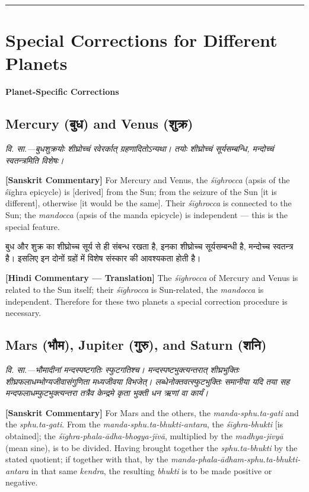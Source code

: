 \documentclass[11pt,a4paper]{book}
\newcommand{\dev}[1]{{\devanagarifont #1}}
\newcommand{\sktcommbilingual}[2]{%
  \par\vspace{0.5em}%
  \noindent\begin{minipage}[t]{0.48\textwidth}
    \RaggedRight\small\itshape
    \dev{#1}
  \end{minipage}%
  \hfill
  \begin{minipage}[t]{0.48\textwidth}
    \RaggedRight\small
    #2%
  \end{minipage}%
  \par\vspace{0.5em}%
}
\newcommand{\hindicommbilingual}[2]{%
  \par\vspace{0.5em}%
  \noindent\begin{minipage}[t]{0.48\textwidth}
    \RaggedRight\small
    \dev{#1}
  \end{minipage}%
  \hfill
  \begin{minipage}[t]{0.48\textwidth}
    \RaggedRight\small
    #2%
  \end{minipage}%
  \par\vspace{0.5em}%
}
\newcommand{\ruleheadingbilingual}[2]{%
  \par\vspace{0.8em}%
  \noindent\begin{minipage}[t]{0.48\textwidth}
    \textbf{\color{sectioncolor}\dev{#1}}
  \end{minipage}%
  \hfill
  \begin{minipage}[t]{0.48\textwidth}
    \textbf{\color{sectioncolor}#2}
  \end{minipage}%
  \par\vspace{0.4em}%
}
\newcommand{\secdivider}{%
  \begin{center}\rule{0.4\textwidth}{0.5pt}\end{center}%
}
\begin{document}
\secdivider
\clearpage

\section{Special Corrections for Different Planets}

\ruleheadingbilingual{विशेषसंस्काराः}{Planet-Specific Corrections}

\subsection*{Mercury (\dev{बुध}) and Venus (\dev{शुक्र})}

\sktcommbilingual{%
\dev{वि. सा.}---बुधशुक्रयोः शीघ्रोच्चं रवेरर्कात्‌ ग्रहणादितोऽन्यथा। तयोः शीघ्रोच्चं सूर्यसम्बन्धि, मन्दोच्चं स्वतन्त्रमिति विशेषः।
}{%
\textbf{[Sanskrit Commentary]} For Mercury and Venus, the \textit{śīghrocca} (apsis of the śīghra epicycle) is [derived] from the Sun; from the seizure of the Sun [it is different], otherwise [it would be the same]. Their \textit{śīghrocca} is connected to the Sun; the \textit{mandocca} (apsis of the manda epicycle) is independent --- this is the special feature.
}

\hindicommbilingual{%
बुध और शुक्र का शीघ्रोच्च सूर्य से ही संबन्ध रखता है, इनका शीघ्रोच्च सूर्यसम्बन्धी है, मन्दोच्च स्वतन्त्र है। इसलिए इन दोनों ग्रहों में विशेष संस्कार की आवश्यकता होती है।
}{%
\textbf{[Hindi Commentary --- Translation]} The \textit{śīghrocca} of Mercury and Venus is related to the Sun itself; their \textit{śīghrocca} is Sun-related, the \textit{mandocca} is independent. Therefore for these two planets a special correction procedure is necessary.
}

\vspace{1em}

\subsection*{Mars (\dev{भौम}), Jupiter (\dev{गुरु}), and Saturn (\dev{शनि})}

\sktcommbilingual{%
\dev{वि. सा.}---भौमादीनां मन्दस्पष्टगतिः स्फुटगतिश्च। मन्दस्पष्टभुक्त्यन्तरात्‌ शीघ्रभुक्तिः शीघ्रफलाधम्भोग्यजीवासंगुणिता मध्यजीवया विभजेत्‌। लब्धेनोक्तवत्स्फुटभुक्तिः समानीया यदि तया सह मन्दफलाधम्फुटभुक्त्यन्तरा तत्रैव केन्द्रमे कृता भुक्ती धन ऋणां वा कार्यं।
}{%
\textbf{[Sanskrit Commentary]} For Mars and the others, the \textit{manda-sphu.ta-gati} and the \textit{sphu.ta-gati}. From the \textit{manda-sphu.ta-bhukti-antara}, the \textit{śīghra-bhukti} [is obtained]; the \textit{śīghra-phala-ādha-bhogya-jīvā}, multiplied by the \textit{madhya-jivyā} (mean sine), is to be divided. Having brought together the \textit{sphu.ta-bhukti} by the stated quotient; if together with that, by the \textit{manda-phala-ādham-sphu.ta-bhukti-antara} in that same \textit{kendra}, the resulting \textit{bhukti} is to be made positive or negative.
}
\end{document}
